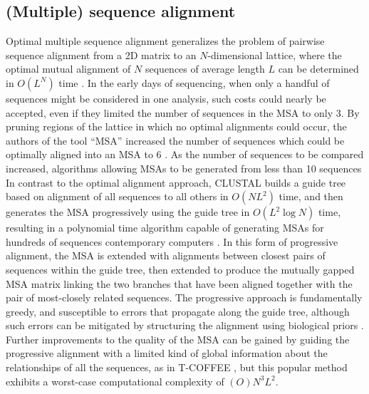 \subsection{(Multiple) sequence alignment}

Optimal multiple sequence alignment generalizes the problem of pairwise sequence alignment from a 2D matrix to an $N$-dimensional lattice, where the optimal mutual alignment of $N$ sequences of average length $L$ can be determined in $O(L^{N})$ time \cite{carrillo1988multiple}.
In the early days of sequencing, when only a handful of sequences might be considered in one analysis, such costs could nearly be accepted, even if they limited the number of sequences in the MSA to only 3.
By pruning regions of the lattice in which no optimal alignments could occur, the authors of the tool ``MSA'' increased the number of sequences which could be optimally aligned into an MSA to 6 \cite{lipman1989tool}.
As the number of sequences to be compared increased, algorithms allowing MSAs to be generated from less than 10 sequences
In contrast to the optimal alignment approach, CLUSTAL builds a guide tree based on alignment of all sequences to all others in $O(NL^{2})$ time, and then generates the MSA progressively using the guide tree in $O(L^{2}\log N)$ time, resulting in a polynomial time algorithm capable of generating MSAs for hundreds of sequences contemporary computers \cite{higgins1988clustal}.
In this form of progressive alignment, the MSA is extended with alignments between closest pairs of sequences within the guide tree, then extended to produce the mutually gapped MSA matrix linking the two branches that have been aligned together with the pair of most-closely related sequences.
The progressive approach is fundamentally greedy, and susceptible to errors that propagate along the guide tree, although such errors can be mitigated by structuring the alignment using biological priors \cite{thompson1994clustal}.
Further improvements to the quality of the MSA can be gained by guiding the progressive alignment with a limited kind of global information about the relationships of all the sequences, as in T-COFFEE \cite{notredame2000t}, but this popular method exhibits a worst-case computational complexity of $(O)N^{3}L^{2}$.

